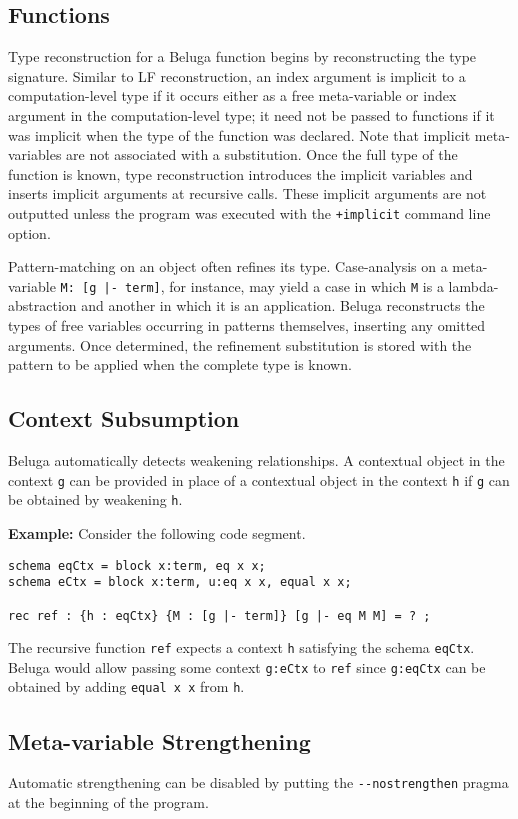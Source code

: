 \documentclass[11pt]{article}
\begin{document}
\subsection{Functions}

Type reconstruction for a Beluga function begins by reconstructing the type signature.
Similar to LF reconstruction, an index argument is implicit to a computation-level type if it occurs either as a free meta-variable or index argument in the computation-level type; it need not be passed to functions if it was implicit when the type of the function was declared.
Note that implicit meta-variables are not associated with a substitution.
Once the full type of the function is known, type reconstruction introduces the implicit variables and inserts implicit arguments at recursive calls.
These implicit arguments are not outputted unless the program was executed with the \texttt{+implicit} command line option.

Pattern-matching on an object often refines its type.
Case-analysis on a meta-variable \verb+M: [g |- term]+, for instance, may yield a case in which \verb+M+ is a lambda-abstraction and another in which it is an application.
Beluga reconstructs the types of free variables occurring in patterns themselves, inserting any omitted arguments.
Once determined, the refinement substitution is stored with the pattern to be applied when the complete type is known.

\subsection{Context Subsumption}
Beluga automatically detects weakening relationships.
A contextual object in the context \verb+g+ can be provided in place of a contextual object in the context \verb+h+ if \verb+g+ can be obtained by weakening \verb+h+.

\textbf{Example:} Consider the following code segment.
\begin{verbatim}
schema eqCtx = block x:term, eq x x;
schema eCtx = block x:term, u:eq x x, equal x x;

rec ref : {h : eqCtx} {M : [g |- term]} [g |- eq M M] = ? ;
\end{verbatim}
The recursive function \verb+ref+ expects a context \verb+h+ satisfying the schema \verb+eqCtx+.
Beluga would allow passing some context \verb+g:eCtx+ to \verb+ref+ since \verb+g:eqCtx+ can be obtained by adding \verb+equal x x+ from \verb+h+.

\subsection{Meta-variable Strengthening}
Automatic strengthening can be disabled by putting the \verb+--nostrengthen+ pragma at the beginning of the program.
\end{document}
